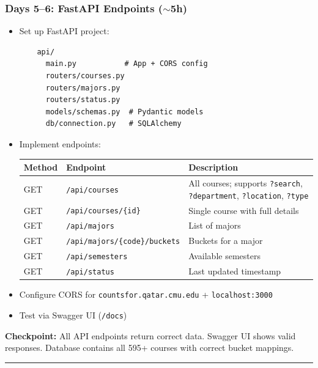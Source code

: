 \documentclass[11pt]{article}
\begin{document}
\subsubsection{Days 5--6: FastAPI Endpoints ($\sim$5h)}

\begin{itemize}[leftmargin=2em]
    \item Set up FastAPI project:
    \begin{verbatim}
    api/
      main.py           # App + CORS config
      routers/courses.py
      routers/majors.py
      routers/status.py
      models/schemas.py  # Pydantic models
      db/connection.py   # SQLAlchemy
    \end{verbatim}
    
    \item Implement endpoints:
    
    \begin{tabular}{p{} p{} p{}}
    \toprule
    \textbf{Method} & \textbf{Endpoint} & \textbf{Description} \\
    \midrule
    GET & \texttt{/api/courses} & All courses; supports \texttt{?search}, \texttt{?department}, \texttt{?location}, \texttt{?type} \\
    GET & \texttt{/api/courses/\{id\}} & Single course with full details \\
    GET & \texttt{/api/majors} & List of majors \\
    GET & \texttt{/api/majors/\{code\}/buckets} & Buckets for a major \\
    GET & \texttt{/api/semesters} & Available semesters \\
    GET & \texttt{/api/status} & Last updated timestamp \\
    \bottomrule
    \end{tabular}
    
    \item Configure CORS for \texttt{countsfor.qatar.cmu.edu} + \texttt{localhost:3000}
    \item Test via Swagger UI (\texttt{/docs})
\end{itemize}

\noindent
\textbf{Checkpoint:} All API endpoints return correct data. Swagger UI shows valid responses. Database contains all 595+ courses with correct bucket mappings.

\noindent\rule{\textwidth}{0.2pt}

\end{document}

